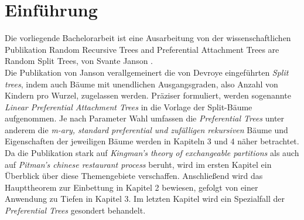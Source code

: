 \chapter{Einführung}
Die vorliegende Bachelorarbeit ist eine Ausarbeitung von der wissenschaftlichen Publikation \glqq Random Recursive Trees and Preferential Attachment Trees are Random Split Trees\grqq, von Svante Janson \cite{janson2019random}.\\
Die Publikation von Janson verallgemeinert die von Devroye \cite{devroye1998universal} eingeführten \textit{Split trees}, indem auch Bäume mit unendlichen Ausgangsgraden, also Anzahl von Kindern pro Wurzel, zugelassen werden. Präziser formuliert, werden sogenannte \textit{Linear Preferential Attachment Trees} in die Vorlage der Split-Bäume aufgenommen. Je nach Parameter Wahl umfassen die \textit{Preferential Trees} unter anderem die \textit{m-ary, standard preferential und zufälligen rekursiven} Bäume und Eigenschaften der jeweiligen Bäume werden in Kapiteln 3 und 4 näher betrachtet. Da die Publikation stark auf \textit{Kingman's theory of exchangeable partitions} \cite{kingman1978representation,kingman1982coalescent} als auch auf \textit{Pitman's chinese restaurant process} \cite{pitman2006combinatorial,pitman1995exchangeable} beruht, wird im ersten Kapitel ein Überblick über diese Themengebiete verschaffen. Anschließend wird das Haupttheorem zur Einbettung in Kapitel 2 bewiesen, gefolgt von einer Anwendung zu Tiefen in Kapitel 3. Im letzten Kapitel wird ein Spezialfall der \textit{Preferential Trees} gesondert behandelt.
